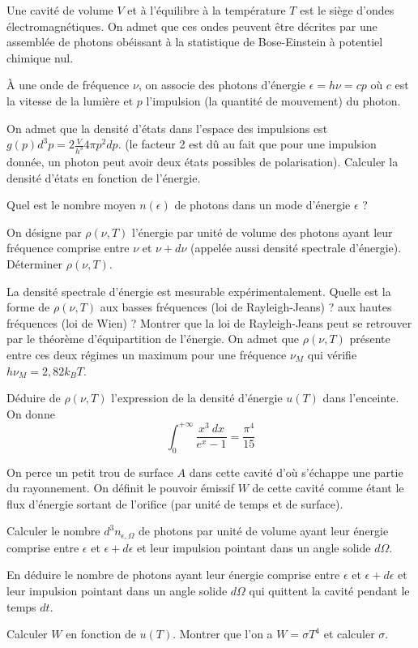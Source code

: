 Une cavité de volume $V$ et à l'équilibre à la température $T$  est le siège d'ondes électromagnétiques. On admet que ces ondes peuvent être décrites par une assemblée de photons obéissant à la statistique de Bose-Einstein à potentiel chimique nul. 

\`A une onde de fréquence $\nu$, on associe des photons d'énergie $\epsilon=h \nu= cp$ où $c$ est la vitesse de la lumière et $p$ l'impulsion (la quantité de mouvement) du photon.

\question
On admet que la densité d'états dans l'espace des impulsions est $g(p) d^3p =2 \frac{V}{h^3} 4 \pi p^2 dp$. (le facteur 2 est dû au fait que pour une impulsion donnée, un photon peut avoir deux états possibles de polarisation). Calculer la densité d'états en fonction de l'énergie.

\question
Quel est le nombre moyen   $n(\epsilon)$ de photons dans un mode d'énergie $\epsilon$ ?

\question
On désigne par $\rho(\nu, T)$ l'énergie par unité de volume des photons ayant leur fréquence comprise entre $\nu$ et $\nu+d\nu$ (appelée aussi densité spectrale d'énergie). Déterminer $\rho(\nu, T)$.

\question
La densité spectrale d'énergie est mesurable expérimentalement. Quelle est la forme de $\rho(\nu, T)$ aux basses fréquences (loi de Rayleigh-Jeans) ?  aux hautes fréquences (loi de Wien) ? Montrer que la loi de Rayleigh-Jeans peut se retrouver par le théorème d'équipartition de l'énergie. On admet que $\rho(\nu, T)$ présente entre ces deux régimes un maximum pour une fréquence $\nu_M$ qui vérifie $h \nu_M=2,82 k_B T$.

\question
Déduire de $\rho(\nu, T)$ l'expression de la densité d'énergie $u(T)$ dans l'enceinte. On donne
$$
\int_0^{+\infty} \frac{x^3 \ dx}{e^x-1}=\frac{\pi^4}{15}
$$

\medskip

On perce un petit trou de surface $A$ dans cette cavité d'où s'échappe une partie du rayonnement. On définit le pouvoir émissif $W$ de cette cavité comme étant le flux d'énergie sortant de l'orifice (par unité de temps et de surface).

\question
Calculer le nombre $d^3 n_{\epsilon, \Omega}$ de photons par unité de volume ayant leur énergie comprise entre $\epsilon$ et $\epsilon+ d\epsilon$ et leur impulsion pointant dans un angle solide $d\Omega$.

\question
En déduire le nombre de photons ayant leur énergie comprise entre $\epsilon$ et $\epsilon+ d\epsilon$ et leur impulsion pointant dans un angle solide $d\Omega$ qui quittent la cavité pendant le temps $dt$. 

\question
Calculer $W$ en fonction de $u(T)$.  Montrer que l'on a $W=\sigma T^4$ et calculer $\sigma$.

